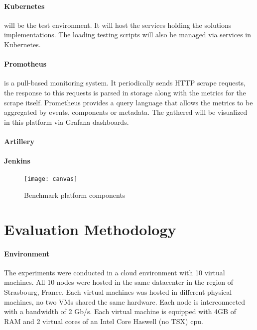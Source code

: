 \paragraph{Kubernetes ~\cite{kubernetes}} will be the test environment.
It will host the services holding the solutions implementations.
The loading testing scripts will also be managed via services in Kubernetes.

\paragraph{Promotheus ~\cite{turnbull2018monitoring}} is a pull-based monitoring system.
It periodically sends HTTP scrape requests, the response to this requests is parsed in storage along with the metrics for the scrape itself.
Prometheus provides a query language that allows the metrics to be aggregated by events, components or metadata.
The gathered will be visualized in this platform via Grafana dashboards.

\paragraph{Artillery}

\paragraph{Jenkins}

\begin{figure}[htbp]
    \centering
    \texttt{[image: canvas]}
    \caption{Benchmark platform components}
    \label{fig:canvas}
\end{figure}

\section{Evaluation Methodology} %
\label{sec:evaluation_methodology}

\paragraph{Environment}

The experiments were conducted in a cloud environment with 10 virtual machines.
All 10 nodes were hosted in the same datacenter in the region of Strasbourg, France.
Each virtual machines was hosted in different physical machines, no two VMs shared the same hardware.
Each node is interconnected with a bandwidth of 2 Gb/s.
Each virtual machine is equipped with 4GB of RAM and 2 virtual cores of an Intel Core Haswell (no TSX) cpu.

